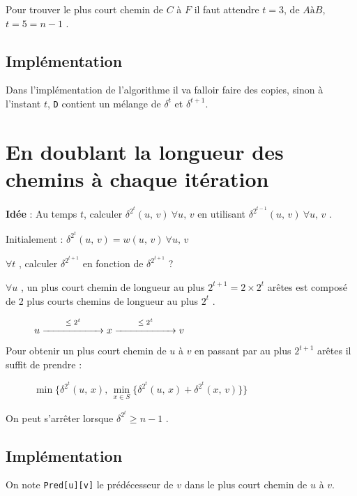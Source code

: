 Pour trouver le plus court chemin de $C$ à $F$ il faut attendre $t = 3$, de $A à B$, $t=5 = n-1$ .

\vspace*{0.2cm}

\subsection*{Implémentation}
Dans l'implémentation de l'algorithme il va falloir faire des copies, sinon à l'instant $t$, \texttt{D} contient un mélange de  $\delta^{t}$ et $\delta^{t+1}$.



\section{En doublant la longueur des chemins à chaque itération}

\textbf{\textcolor{ocre}{Idée}} : Au temps $t$, calculer $\delta^{2^{t}}(u,\, v) \ \forall u,\, v$ en utilisant $\delta^{2^{t-1}}(u,\, v) \ \forall u,\, v$ .

Initialement :  $\delta^{2^{t}}(u,\, v) = w(u,\, v) \ \forall u,\, v$

$\forall t$ , calculer $\delta^{2^{t+1}}$ en fonction de $\delta^{2^{t+1}}$ ?

$\forall u$ , un plus court chemin de longueur au plus $2^{t+1} = 2 \times 2^{t}$ arêtes est composé de 2 plus courts chemins de longueur au plus $2^{t}$ .

\begin{figure}[h]
\centering
$u \overset{\leq \; 2^{t}}{\xrightarrow{\hspace*{2cm}}} x \overset{\leq \; 2^{t}}{\xrightarrow{\hspace*{2cm}}} v$
\end{figure}

Pour obtenir un plus court chemin de $u$ à $v$ en passant par au plus $2^{t+1}$ arêtes il suffit de prendre :

\begin{figure}[h]
\centering
$\min \lbrace \delta^{2^{t}}(u,\, x),\, \min\limits_{x \in S} \lbrace \delta^{2^{t}}(u,\, x) + \delta^{2^{t}}(x,\, v) \rbrace \rbrace$
\end{figure}

On peut s'arrêter lorsque $\delta^{2^{t}} \geq n - 1$ .

\subsection*{Implémentation}
On note \texttt{Pred[u][v]} le prédécesseur de $v$ dans le plus court chemin de $u$ à $v$.

